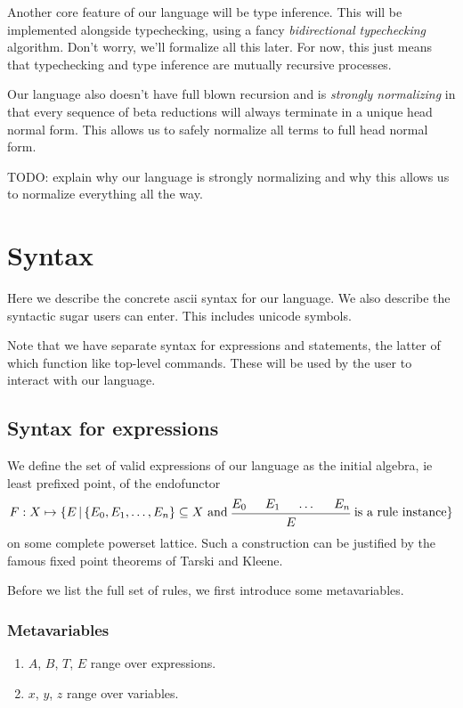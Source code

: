 \documentclass{article}
\begin{document}
Another core feature of our language will be type inference.
This will be implemented alongside typechecking, using a fancy
\textit{bidirectional typechecking} algorithm. Don't worry, we'll formalize all
this later. For now, this just means that typechecking and type inference are
mutually recursive processes.

Our language also doesn't have full blown recursion and is
\textit{strongly normalizing} in that every sequence of beta reductions will
always terminate in a unique head normal form. This allows us to safely
normalize all terms to full head normal form.

TODO: explain why our language is strongly normalizing and why this allows us to
normalize everything all the way.

\section{Syntax}
Here we describe the concrete ascii syntax for our language.
We also describe the syntactic sugar users can enter. This includes unicode
symbols.

Note that we have separate syntax for expressions and statements, the latter of 
which function like top-level commands. These will be used by the user to interact
with our language.

\subsection{Syntax for expressions}
We define the set of valid expressions of our language as the initial algebra, 
ie least prefixed point, of the endofunctor
\begin{align*}
  F : X \mapsto \{ E \, | \, \{ E_0, E_1, \dots, E_n \} \subseteq X \text{ and }
    \begin{prooftree}   
      \hypo{E_0}
      \hypo{E_1}
      \hypo{\dots}
      \hypo{E_n}
      \infer4{E}
    \end{prooftree}
    \text{ is a rule instance}
  \} 
\end{align*}
on some complete powerset lattice.
Such a construction can be justified by the famous fixed point theorems of Tarski
and Kleene.

Before we list the full set of rules, we first introduce some metavariables.

\subsubsection{Metavariables}
\begin{enumerate}
  \item $A$, $B$, $T$, $E$ range over expressions. 
  \item $x$, $y$, $z$ range over variables.
\end{enumerate}
\end{document}
